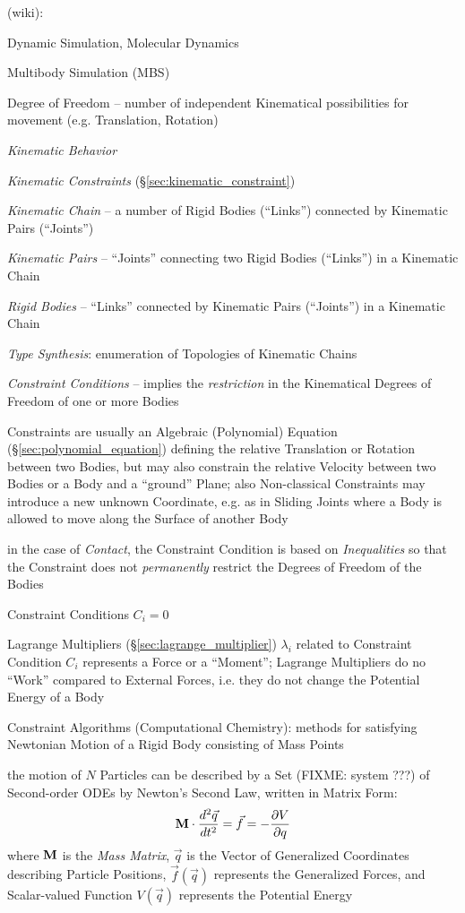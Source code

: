 (wiki):

Dynamic Simulation, Molecular Dynamics

Multibody Simulation (MBS)

Degree of Freedom -- number of independent Kinematical possibilities for
movement (e.g. Translation, Rotation)

\emph{Kinematic Behavior}

\emph{Kinematic Constraints} (\S\ref{sec:kinematic_constraint})

\emph{Kinematic Chain} -- a number of Rigid Bodies (``Links'') connected by
Kinematic Pairs (``Joints'')

\emph{Kinematic Pairs} -- ``Joints'' connecting two Rigid Bodies (``Links'') in
a Kinematic Chain

\emph{Rigid Bodies} -- ``Links'' connected by Kinematic Pairs (``Joints'') in a
Kinematic Chain

\emph{Type Synthesis}: enumeration of Topologies of Kinematic Chains

\emph{Constraint Conditions} -- implies the \emph{restriction} in the
Kinematical Degrees of Freedom of one or more Bodies

Constraints are usually an Algebraic (Polynomial) Equation
(\S\ref{sec:polynomial_equation}) defining the relative Translation or Rotation
between two Bodies, but may also constrain the relative Velocity between two
Bodies or a Body and a ``ground'' Plane; also Non-classical Constraints may
introduce a new unknown Coordinate, e.g. as in Sliding Joints where a Body is
allowed to move along the Surface of another Body

in the case of \emph{Contact}, the Constraint Condition is based on
\emph{Inequalities} so that the Constraint does not \emph{permanently} restrict
the Degrees of Freedom of the Bodies

Constraint Conditions $C_i = 0$

Lagrange Multipliers (\S\ref{sec:lagrange_multiplier}) $\lambda_i$ related to
Constraint Condition $C_i$ represents a Force or a ``Moment''; Lagrange
Multipliers do no ``Work'' compared to External Forces, i.e. they do not change
the Potential Energy of a Body

Constraint Algorithms (Computational Chemistry): methods for satisfying
Newtonian Motion of a Rigid Body consisting of Mass Points

the motion of $N$ Particles can be described by a Set (FIXME: system ???) of
Second-order ODEs by Newton's Second Law, written in Matrix Form:
\[
  \mathbf{M} \cdot \frac{d^2\vec{q}}{dt^2}
    = \vec{f} = -\frac{\partial{V}}{\partial{q}}
\]
where $\mathbf{M}$ is the \emph{Mass Matrix}, $\vec{q}$ is the Vector of
Generalized Coordinates describing Particle Positions, $\vec{f}(\vec{q})$
represents the Generalized Forces, and Scalar-valued Function $V(\vec{q})$
represents the Potential Energy

